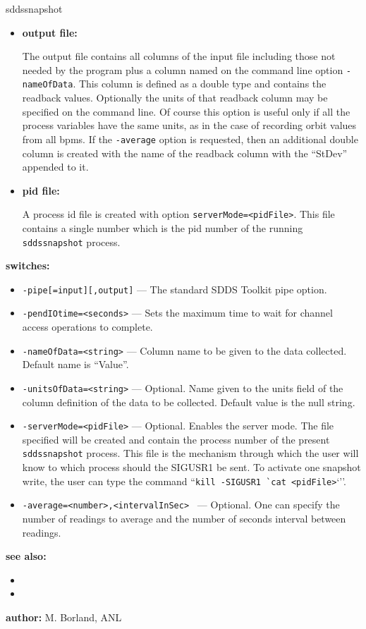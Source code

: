 \begin{sddsprog}{sddssnapshot}
\begin{itemize}
  \item \textbf{output file:}\par
The output file contains all columns of the input file including those
not needed by the program plus a column named on the command line option {\tt -nameOfData}.
This column is defined as a double type and contains the readback values.
Optionally the units of that readback column may be specified on the command line.
Of course this option is useful only if all the process variables have the same units, as in
the case of recording orbit values from all bpms.
If the {\tt -average} option is requested, then an additional double column is created with the name
of the readback column with the ``StDev'' appended to it.

  \item \textbf{pid file:}\par
A process id file is created with option {\verb+serverMode=<pidFile>+}. This file contains a single
number which is the pid number of the running {\verb+sddssnapshot+} process.
\end{itemize}
\item \textbf{switches:}
\begin{itemize}
  \item {\tt -pipe[=input][,output]} --- The standard SDDS Toolkit pipe option.
  \item {\tt -pendIOtime=<seconds>} --- Sets the maximum time to wait for channel access operations to complete.
  \item {\tt -nameOfData=<string>} --- Column name to be given to the data collected. Default name is ``Value''.
  \item {\tt -unitsOfData=<string>} --- Optional. Name given to the units field of the column definition
                        of the data to be collected. Default value is the null string.
  \item {\tt -serverMode=<pidFile>} --- Optional. Enables the server mode. The file specified will be created and contain
                the process number of the present \verb+sddssnapshot+ process. This file is the mechanism
                through which the user will know to which process should the SIGUSR1 be sent.
                To activate one snapshot write, the user can type
                the command ``\verb+kill -SIGUSR1 `cat <pidFile>+`''.
  \item {\tt -average=<number>,<intervalInSec> } --- Optional. One can specify the number of readings to
                average and the number of seconds interval between readings.
\end{itemize}

\item \textbf{see also:}
\begin{itemize}
  \item {}
  \item {}
\end{itemize}
\item \textbf{author:} M. Borland, ANL
\end{sddsprog}
